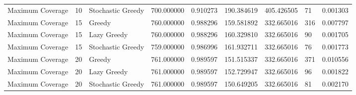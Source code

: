 \begin{tabular}{lllllllll}
Maximum Coverage & 10 & Stochastic Greedy & 700.000000 & 0.910273 & 190.384619 & 405.426505 & 71 & 0.001303 \\
Maximum Coverage & 15 & Greedy & 760.000000 & 0.988296 & 159.581892 & 332.665016 & 316 & 0.007797 \\
Maximum Coverage & 15 & Lazy Greedy & 760.000000 & 0.988296 & 160.329810 & 332.665016 & 90 & 0.001705 \\
Maximum Coverage & 15 & Stochastic Greedy & 759.000000 & 0.986996 & 161.932711 & 332.665016 & 76 & 0.001773 \\
Maximum Coverage & 20 & Greedy & 761.000000 & 0.989597 & 151.515337 & 332.665016 & 371 & 0.010556 \\
Maximum Coverage & 20 & Lazy Greedy & 761.000000 & 0.989597 & 152.729947 & 332.665016 & 96 & 0.001822 \\
Maximum Coverage & 20 & Stochastic Greedy & 761.000000 & 0.989597 & 150.649205 & 332.665016 & 81 & 0.002170 \\
\hline
\end{tabular}
